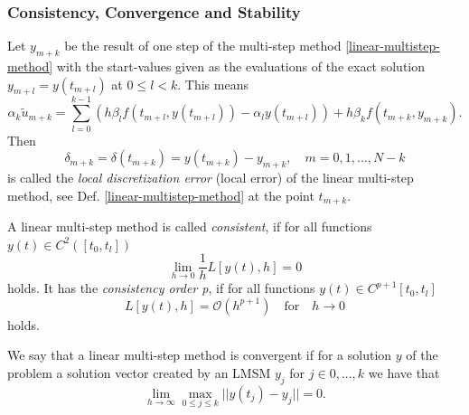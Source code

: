 	\subsubsection{Consistency, Convergence and Stability}
	
	\begin{frame}
		\begin{definition}
			Let $y_{m+k}$ be the result of one step of the multi-step method \eqref{linear-multistep-method} with the start-values given as the evaluations of the exact solution $y_{m+l} = y(t_{m+l})$ at $0 \leq l < k$. This means
			\begin{displaymath}
				\alpha_k \tilde{u}_{m+k} = \sum_{l=0}^{k-1} \left( h \beta_l f(t_{m+l}, y(t_{m+l})) - \alpha_l y(t_{m+l}) \right) + h \beta_k f(t_{m+k}, y_{m+k}) .
			\end{displaymath}
			Then
			\begin{displaymath}
				\delta_{m+k} = \delta(t_{m+k}) = y(t_{m+k}) - y_{m+k}, \quad m=0,1,...,N-k
			\end{displaymath}
			is called the \emph{local discretization error} (local error) of the linear multi-step method, see Def. \ref{linear-multistep-method} at the point $t_{m+k}$.
		\end{definition}
	\end{frame}
	
	\begin{frame}
		\begin{definition}
			A linear multi-step method is called %
			\emph{consistent}, if for all functions $y(t) \in C^2([t_0,t_l])$
			\begin{displaymath}
				\lim\limits_{h \to 0} \frac{1}{h} L[y(t),h] = 0
			\end{displaymath}
			holds. It has the \emph{consistency order p}, if for all functions $y(t) \in C^{p+1}[t_0, t_l]$
			\begin{displaymath}
				L[y(t),h] = \mathcal{O}(h^{p+1}) \quad \text{for} \quad h \to 0
			\end{displaymath}
			holds.
		\end{definition}
	\end{frame}
	
	\begin{frame}
		\begin{definition} \label{def: LMSM convergence}
			We say that a linear multi-step method is convergent if for a solution $y$ of the problem a solution vector created by an LMSM $y_j$ for $j \in {0,...,k}$ we have that
			\begin{displaymath}
				\lim\limits_{h \to \infty} \max_{0 \leq j \leq k} ||y(t_j) - y_j|| = 0.
			\end{displaymath}
		\end{definition}
	\end{frame}
	
